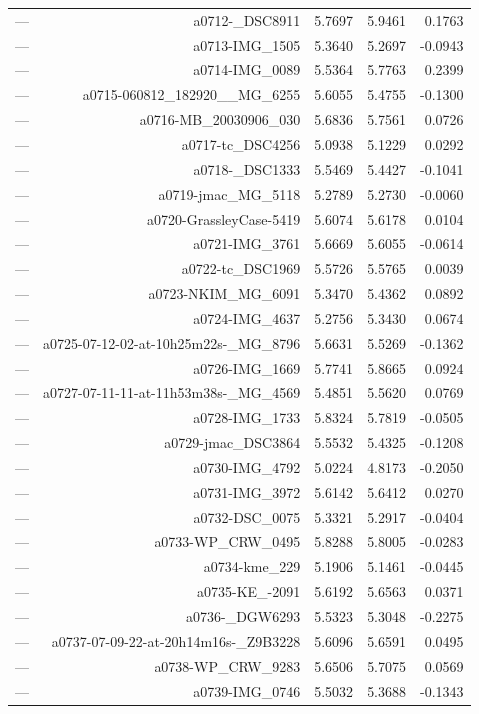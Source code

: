 \begin{table}[htbp]
\begin{tabular}{lrrrr}
— & a0712-_DSC8911 & 5.7697 & 5.9461 & 0.1763 \\
— & a0713-IMG_1505 & 5.3640 & 5.2697 & -0.0943 \\
— & a0714-IMG_0089 & 5.5364 & 5.7763 & 0.2399 \\
— & a0715-060812_182920__MG_6255 & 5.6055 & 5.4755 & -0.1300 \\
— & a0716-MB_20030906_030 & 5.6836 & 5.7561 & 0.0726 \\
— & a0717-tc_DSC4256 & 5.0938 & 5.1229 & 0.0292 \\
— & a0718-_DSC1333 & 5.5469 & 5.4427 & -0.1041 \\
— & a0719-jmac_MG_5118 & 5.2789 & 5.2730 & -0.0060 \\
— & a0720-GrassleyCase-5419 & 5.6074 & 5.6178 & 0.0104 \\
— & a0721-IMG_3761 & 5.6669 & 5.6055 & -0.0614 \\
— & a0722-tc_DSC1969 & 5.5726 & 5.5765 & 0.0039 \\
— & a0723-NKIM_MG_6091 & 5.3470 & 5.4362 & 0.0892 \\
— & a0724-IMG_4637 & 5.2756 & 5.3430 & 0.0674 \\
— & a0725-07-12-02-at-10h25m22s-_MG_8796 & 5.6631 & 5.5269 & -0.1362 \\
— & a0726-IMG_1669 & 5.7741 & 5.8665 & 0.0924 \\
— & a0727-07-11-11-at-11h53m38s-_MG_4569 & 5.4851 & 5.5620 & 0.0769 \\
— & a0728-IMG_1733 & 5.8324 & 5.7819 & -0.0505 \\
— & a0729-jmac_DSC3864 & 5.5532 & 5.4325 & -0.1208 \\
— & a0730-IMG_4792 & 5.0224 & 4.8173 & -0.2050 \\
— & a0731-IMG_3972 & 5.6142 & 5.6412 & 0.0270 \\
— & a0732-DSC_0075 & 5.3321 & 5.2917 & -0.0404 \\
— & a0733-WP_CRW_0495 & 5.8288 & 5.8005 & -0.0283 \\
— & a0734-kme_229 & 5.1906 & 5.1461 & -0.0445 \\
— & a0735-KE_-2091 & 5.6192 & 5.6563 & 0.0371 \\
— & a0736-_DGW6293 & 5.5323 & 5.3048 & -0.2275 \\
— & a0737-07-09-22-at-20h14m16s-_Z9B3228 & 5.6096 & 5.6591 & 0.0495 \\
— & a0738-WP_CRW_9283 & 5.6506 & 5.7075 & 0.0569 \\
— & a0739-IMG_0746 & 5.5032 & 5.3688 & -0.1343 \\

\end{tabular}
\end{table}
